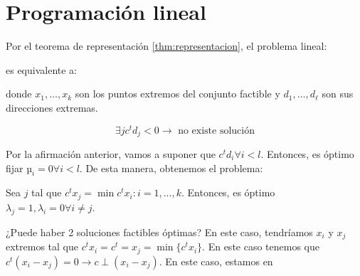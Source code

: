 \section{Programación lineal}

Por el teorema de representación \ref{thm:representacion}, el problema lineal:


\begin{ioprob}
\end{ioprob}

es equivalente a:

\begin{ioprob}
\end{ioprob}

donde $x_1,\ldots, x_k$ son los puntos extremos del conjunto factible y  $d_1,\ldots,d_\ell$ son sus direcciones extremas.



\[\exists j c^td_j < 0 \to \text{ no existe solución}\]

Por la afirmación anterior, vamos a suponer que $c^td_i ∀i < l$. Entonces, es óptimo fijar $µ_i = 0∀i<l$. De esta manera, obtenemos el problema:
\begin{ioprob}
\end{ioprob}

Sea $j$ tal que $c^tx_j = \min{c^tx_i : i = 1,..., k}$. Entonces, es óptimo $λ_j = 1, λ_i = 0 ∀i≠j$.


\begin{figure}[h]
\centering
{}
\end{figure}


¿Puede haber 2 soluciones factibles óptimas? En este caso, tendríamos $x_i$ y $x_j$ extremos tal que $c^tx_i = c^t = x_j = \min\{c^tx_i \}$. En este caso tenemos que $c^t(x_i - x_j) = 0 \to c\perp (x_i-x_j)$. En este caso, estamos en


